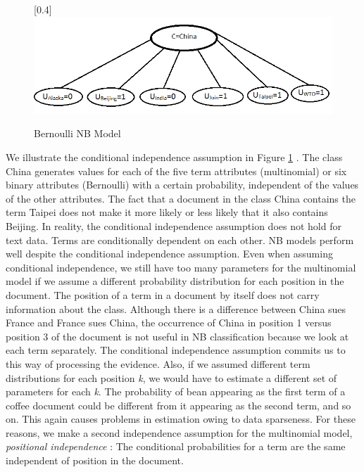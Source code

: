 \documentclass[journal]{IEEEtran}
\begin{document}
\begin{center}
	\begin{figure}[H]
		\scalebox{0.4}[0.4]{\includegraphics{BernoulliNBModel}}
		\caption{Bernoulli NB Model}
		\label{Bernoulli NB Model}
	\end{figure}\end{center}
We illustrate the conditional independence assumption in Figure \ref{Bernoulli NB Model} . The class China generates values for each of the five term attributes (multinomial) or six binary attributes (Bernoulli) with a certain probability, independent of the values of the other attributes. The fact that a document in the class China contains the term Taipei does not make it more likely or less likely that it also contains Beijing.
In reality, the conditional independence assumption does not hold for text data. Terms are conditionally dependent on each other. NB models perform well despite the conditional independence assumption. Even when assuming conditional independence, we still have too many parameters for the multinomial model if we assume a different probability distribution for each position in the document. The position of a term in a document by itself does not carry information about the class.
Although there is a difference between China sues France and France sues China, the occurrence of China in position 1 versus position 3 of the document is not useful in NB classification because we look at each term separately. The conditional independence assumption commits us to this way of processing the evidence. Also, if we assumed different term distributions for each position \textit{k}, we would have to estimate a different set of parameters for each \textit{k}. The probability of bean appearing as the first term of a coffee document could be different from it appearing as the second term, and so on. This again causes problems in estimation owing to data sparseness. For these reasons, we make a second independence assumption for the multinomial model, \textit{positional independence} : The conditional probabilities for a term are the same independent of position in the document.
\end{document}
